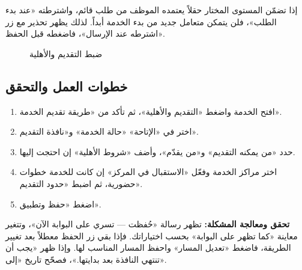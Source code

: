 \begin{rcwarn}
إذا تضمّن المستوى المختار حقلاً يعتمده الموظف من طلب قائم، واشترطته «عند بدء الطلب»، فلن يتمكن متعامل جديد من بدء الخدمة أبداً. لذلك يظهر تحذير مع زر «اشترطه عند الإرسال»، فاضغطه قبل الحفظ.
\end{rcwarn}

\begin{figure}[H]
\centering
{}
\rclegend
\caption{ضبط التقديم والأهلية}
\label{fig:builder-services-delivery-flow}
\end{figure}

\subsection{خطوات العمل والتحقق}
\begin{enumerate}
\item افتح الخدمة واضغط «التقديم والأهلية»، ثم تأكد من «طريقة تقديم الخدمة».
\item اختر في «الإتاحة» «حالة الخدمة» و«نافذة التقديم».
\item حدد «من يمكنه التقديم» و«من يقدّم»، وأضف «شروط الأهلية» إن احتجت إليها.
\item اختر مراكز الخدمة وفعّل «الاستقبال في المركز» إن كانت للخدمة خطوات حضورية، ثم اضبط «حدود التقديم».
\item اضغط «حفظ وتطبيق».
\end{enumerate}

\textbf{تحقق ومعالجة المشكلة:} تظهر رسالة «حُفظت — تسري على البوابة الآن»، وتتغير معاينة «كما تظهر على البوابة» بحسب اختياراتك. فإذا بقي زر الحفظ معطلاً بعد تغيير الطريقة، فاضغط «تعديل المسار» واحفظ المسار المناسب لها. وإذا ظهر «يجب أن تنتهي النافذة بعد بدايتها.»، فصحّح تاريخ «إلى».

